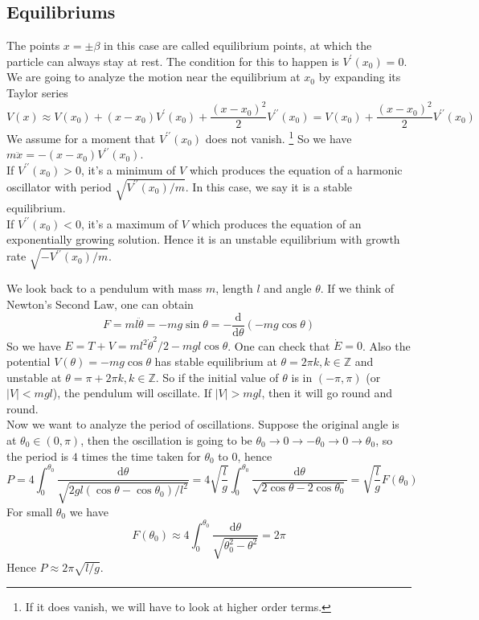 \subsection{Equilibriums}
The points $x=\pm\beta$ in this case are called equilibrium points, at which the particle can always stay at rest.
The condition for this to happen is $V^\prime(x_0)=0$.
We are going to analyze the motion near the equilibrium at $x_0$ by expanding its Taylor series
$$V(x)\approx V(x_0)+(x-x_0)V^\prime(x_0)+\frac{(x-x_0)^2}{2}V^{\prime\prime}(x_0)=V(x_0)+\frac{(x-x_0)^2}{2}V^{\prime\prime}(x_0)$$
We assume for a moment that $V^{\prime\prime}(x_0)$ does not vanish.
\footnote{If it does vanish, we will have to look at higher order terms.}
So we have $m\ddot{x}=-(x-x_0)V^{\prime\prime}(x_0)$.\\
If $V^{\prime\prime}(x_0)>0$, it's a minimum of $V$ which produces the equation of a harmonic oscillator with period $\sqrt{V^{\prime\prime}(x_0)/m}$.
In this case, we say it is a stable equilibrium.\\
If $V^{\prime\prime}(x_0)<0$, it's a maximum of $V$ which produces the equation of an exponentially growing solution.
Hence it is an unstable equilibrium with growth rate $\sqrt{-V^{\prime\prime}(x_0)/m}$.
\begin{example}
    We look back to a pendulum with mass $m$, length $l$ and angle $\theta$.
    If we think of Newton's Second Law, one can obtain
    $$F=ml\ddot{\theta}=-mg\sin\theta=-\frac{\mathrm d}{\mathrm d\theta}(-mg\cos\theta)$$
    So we have $E=T+V=ml^2\dot{\theta}^2/2-mgl\cos\theta$.
    One can check that $\dot{E}=0$.
    Also the potential $V(\theta)=-mg\cos\theta$ has stable equilibrium at $\theta=2\pi k,k\in\mathbb Z$ and unstable at $\theta=\pi+2\pi k,k\in\mathbb Z$.
    So if the initial value of $\theta$ is in $(-\pi,\pi)$ (or $|V|<mgl$), the pendulum will oscillate.
    If $|V|>mgl$, then it will go round and round.\\
    Now we want to analyze the period of oscillations.
    Suppose the original angle is at $\theta_0\in (0,\pi)$, then the oscillation is going to be $\theta_0\to 0\to-\theta_0\to0\to\theta_0$, so the period is $4$ times the time taken for $\theta_0$ to $0$, hence
    $$P=4\int_0^{\theta_0}\frac{\mathrm d\theta}{\sqrt{2gl(\cos\theta-\cos\theta_0)/l^2}}=4\sqrt{\frac{l}{g}}\int_0^{\theta_0}\frac{\mathrm d\theta}{\sqrt{2\cos\theta-2\cos\theta_0}}=\sqrt{\frac{l}{g}}F(\theta_0)$$
    For small $\theta_0$ we have
    $$F(\theta_0)\approx 4\int_0^{\theta_0}\frac{\mathrm d\theta}{\sqrt{\theta_0^2-\theta^2}}=2\pi$$
    Hence $P\approx 2\pi\sqrt{l/g}$.
\end{example}
